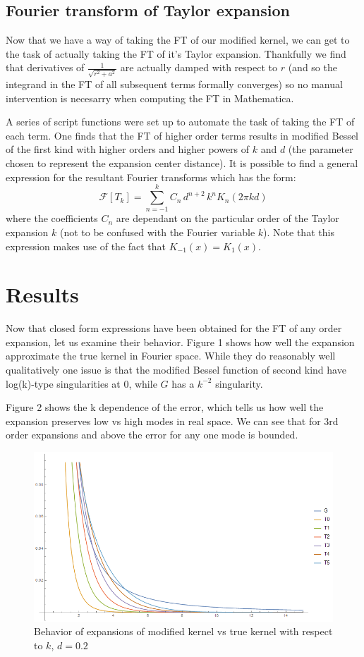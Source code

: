 \documentclass[letterpaper,10pt]{article}
\begin{document}
\subsection*{Fourier transform of Taylor expansion}
Now that we have a way of taking the FT of our modified kernel, we can get to the task of actually taking the FT of it's Taylor expansion. Thankfully we find that derivatives of $\frac{1}{\sqrt{r^2+a^2}}$ are actually damped with respect to $r$ (and so the integrand in the FT of all subsequent terms formally converges) so no manual intervention is necesarry when computing the FT in Mathematica.

A series of script functions were set up to automate the task of taking the FT of each term. One finds that the FT of higher order terms results in modified Bessel of the first kind with higher orders and higher powers of $k$ and $d$ (the parameter chosen to represent the expansion center distance). It is possible to find a general expression for the resultant Fourier transforms which has the form:
$$\mathcal{F}[T_k] = \sum_{n=-1}^k C_n \, d^{n+2} \, k^nK_n(2 \pi k d)$$
where the coefficients $C_n$ are dependant on the particular order of the Taylor expansion $k$ (not to be confused with the Fourier variable $k$). Note that this expression makes use of the fact that $K_{-1}(x) = K_1(x)$.

\section*{Results}
Now that closed form expressions have been obtained for the FT of any order expansion, let us examine their behavior. Figure 1 shows how well the expansion approximate the true kernel in Fourier space. While they do reasonably well qualitatively one issue is that the modified Bessel function of second kind have log(k)-type singularities at 0, while $G$ has a $k^{-2}$ singularity.

Figure 2 shows the k dependence of the error, which tells us how well the expansion preserves low vs high modes in real space. We can see that for 3rd order expansions and above the error for any one mode is bounded.

\begin{figure}
\centering
\includegraphics[width=5in]{T.PNG}
\caption{Behavior of expansions of modified kernel vs true kernel with respect to $k$, $d=0.2$}
\end{figure}
\end{document}
